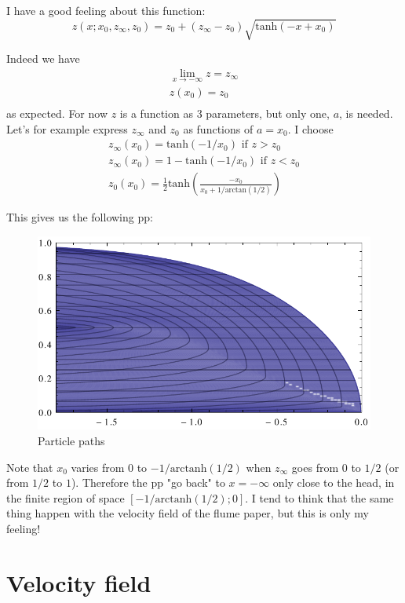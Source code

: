 \documentclass[11pt]{article}
\begin{document}
I have a good feeling about this function:
\[
z(x; x_0, z_\infty, z_0) = z_0 + (z_\infty - z_0) \sqrt {\text{tanh} (-x + x_0)}
\]

Indeed we have 
\[
\begin{matrix}
	\lim_{x \rightarrow -\infty} z = z_\infty \\
	z(x_0) = z_0 \\
\end{matrix}
\]
as expected. For now $z$ is a function as 3 parameters, but only one, $a$, is needed.
Let's for example express $z_\infty$ and $z_0$ as functions of $a = x_0$. I choose
\[
\begin{matrix}
   z_\infty(x_0) = \text{tanh}(-1/x_0) \text{ if } z > z_0 \\
   z_\infty(x_0) = 1 - \text{tanh}(-1/x_0) \text{ if } z < z_0 \\
   z_0(x_0) = \frac{1}{2} \text{tanh}\left(\frac{-x_0}{x_0+1/\text{arctan}(1/2)}\right) 
\end{matrix}
\]

This gives us the following pp:

\begin{figure}[htp]
\centering
\includegraphics[scale=0.9]{remap_particle_paths.pdf}
\caption{Particle paths}
\label{}
\end{figure}

Note that $x_0$ varies from $0$ to $-1/\text{arctanh}(1/2)$ when $z_\infty$ goes from $0$ to $1/2$ (or from $1/2$ to $1$).
Therefore the pp "go back" to $x = -\infty$ only close to the head, in the finite region of space $[-1/\text{arctanh}(1/2);0]$.
I tend to think that the same thing happen with the velocity field of the flume paper, but this is only my feeling!

\section{Velocity field}
\end{document}
